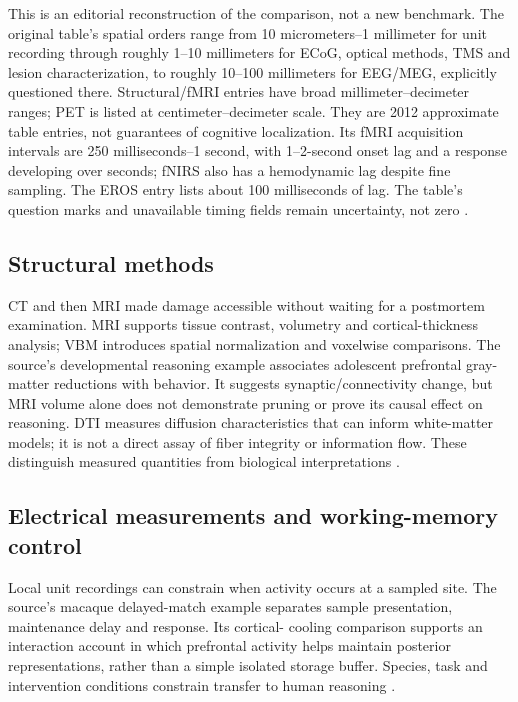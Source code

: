 This is an editorial reconstruction of the comparison, not a new
benchmark. The original table's spatial orders range from
10 micrometers--1 millimeter for unit recording through roughly
1--10 millimeters for ECoG, optical methods, TMS and lesion characterization,
to roughly 10--100 millimeters for EEG/MEG, explicitly questioned
there. Structural/fMRI entries have broad millimeter--decimeter
ranges; PET is listed at centimeter--decimeter scale. They are
2012 approximate table entries, not guarantees of cognitive localization.
Its fMRI acquisition intervals are 250 milliseconds--1 second,
with 1--2-second onset lag and a response developing over seconds;
fNIRS also has a hemodynamic lag despite fine sampling. The EROS
entry lists about 100 milliseconds of lag. The table's question
marks and unavailable timing fields remain uncertainty, not zero
\cite[table~6.1, pp.~69--71]{MorrisonKnowlton2012Methods}.

\subsection{Structural methods}

CT and then MRI made damage accessible without waiting for a
postmortem examination. MRI supports tissue contrast, volumetry
and cortical-thickness analysis; VBM introduces spatial normalization
and voxelwise comparisons. The source's developmental reasoning
example associates adolescent prefrontal gray-matter reductions
with behavior. It suggests synaptic/connectivity change, but MRI
volume alone does not demonstrate pruning or prove its causal
effect on reasoning. DTI measures diffusion characteristics that
can inform white-matter models; it is not a direct assay of
fiber integrity or information flow. These distinguish measured
quantities from biological interpretations
\cite[pp.~73--74]{MorrisonKnowlton2012Methods}.

\subsection{Electrical measurements and working-memory control}

Local unit recordings can constrain when activity occurs at a
sampled site. The source's macaque delayed-match example separates
sample presentation, maintenance delay and response. Its cortical-
cooling comparison supports an interaction account in which
prefrontal activity helps maintain posterior representations, rather
than a simple isolated storage buffer. Species, task and intervention
conditions constrain transfer to human reasoning
\cite[pp.~74--75]{MorrisonKnowlton2012Methods}.

